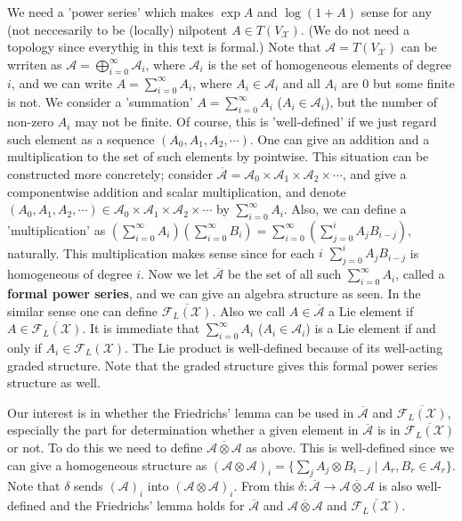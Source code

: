 \documentclass{article}
\newcommand{\SBar}{\;|\;}
\begin{document}
We need a 'power series' which makes $\exp{A}$ and $\log{(1 + A)}$ sense for any (not neccesarily to be (locally) nilpotent $A \in T(V_{\mathcal{X}})$.
(We do not need a topology since everythig in this text is formal.)
Note that $\mathcal{A} = T(V_\mathcal{X})$ can be wrriten as $\mathcal{A} = \bigoplus_{i = 0}^\infty \mathcal{A}_i$, where $\mathcal{A}_i$ is the set of homogeneous elements of degree $i$, and we can write $A = \sum_{i = 0}^\infty A_i$, where $A_i \in \mathcal{A}_i$ and all $A_i$ are 0 but some finite is not.
We consider a 'summation' $A = \sum_{i = 0}^\infty A_i$ ($A_i \in \mathcal{A}_i$), but the number of non-zero $A_i$ may not be finite.
Of course, this is 'well-defined' if we just regard such element as a sequence $(A_0, A_1, A_2, \cdots)$.
One can give an addition and a multiplication to the set of such elements by pointwise.
This situation can be constructed more concretely; consider $\overline{\mathcal{A}} = \mathcal{A}_0 \times \mathcal{A}_1 \times \mathcal{A}_2 \times \cdots$, and give a componentwise addition and scalar multiplication, and denote $(A_0, A_1, A_2, \cdots) \in \mathcal{A}_0 \times \mathcal{A}_1 \times \mathcal{A}_2 \times \cdots$ by $\sum_{i = 0}^\infty A_i$.
Also, we can define a 'multiplication' as $(\sum_{i = 0}^\infty A_i) (\sum_{i = 0}^\infty B_i) = \sum_{i = 0}^\infty (\sum_{j = 0}^i A_j B_{i - j})$, naturally.
This multiplication makes sense since for each $i$ $\sum_{j = 0}^i A_j B_{i - j}$ is homogeneous of degree $i$.
Now we let $\overline{\mathcal{A}}$ be the set of all such $\sum_{i = 0}^\infty A_i$, called a \textbf{formal power series}, and we can give an algebra structure as seen.
In the similar sense one can define $\overline{\mathcal{F}_L(\mathcal{X})}$.
Also we call $A \in \overline{\mathcal{A}}$ a Lie element if $A \in \overline{\mathcal{F}_L(\mathcal{X})}$.
It is immediate that $\sum_{i = 0}^\infty A_i$ ($A_i \in \mathcal{A}_i$) is a Lie element if and only if $A_i \in \mathcal{F}_L(\mathcal{X})$.
The Lie product is well-defined because of its well-acting graded structure.
Note that the graded structure gives this formal power series structure as well.

Our interest is in whether the Friedrichs' lemma can be used in $\overline{\mathcal{A}}$ and $\overline{\mathcal{F}_L(\mathcal{X})}$, especially the part for determination whether a given element in $\overline{\mathcal{A}}$ is in $\overline{\mathcal{F}_L(\mathcal{X})}$ or not.
To do this we need to define $\overline{\mathcal{A} \otimes \mathcal{A}}$ as above.
This is well-defined since we can give a homogeneous structure as $(\mathcal{A} \otimes \mathcal{A})_i = \{\sum_j A_j \otimes B_{i - j} \SBar A_r, B_r \in \mathcal{A}_r\}$.
Note that $\delta$ sends $(\mathcal{A})_i$ into $(\mathcal{A} \otimes \mathcal{A})_i$.
From this $\delta : \overline{\mathcal{A}} \to \overline{\mathcal{A} \otimes \mathcal{A}}$ is also well-defined and the Friedrichs' lemma holds for $\overline{\mathcal{A}}$ and $\overline{\mathcal{A} \otimes \mathcal{A}}$ and $\overline{\mathcal{F}_L(\mathcal{X})}$.
\end{document}
